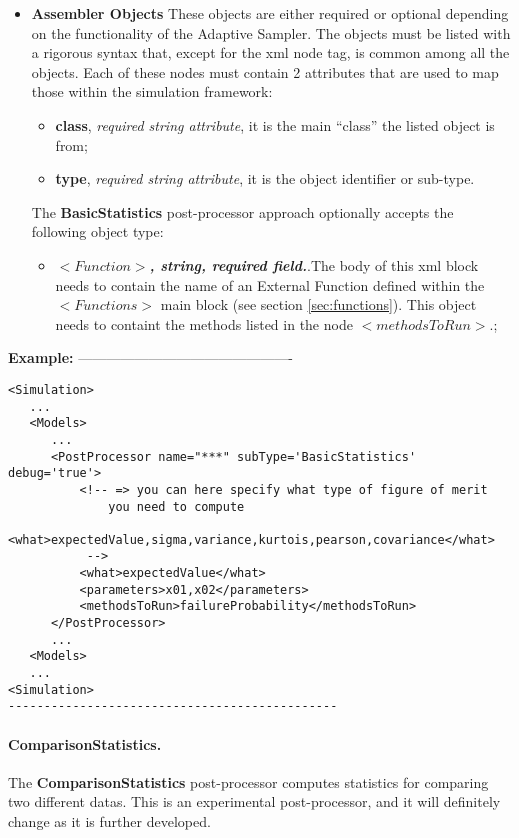 \begin{itemize}
   \item \textbf{Assembler Objects} These objects are either required or optional depending on the functionality of the Adaptive Sampler. The objects must be listed with a rigorous syntax that, except for the xml node tag, is common among all the objects.  
Each of these nodes  must contain 2 attributes that are used to map those within the simulation framework:
   \begin{itemize}
     \item \textbf{class}, \textit{required string attribute}, it is the main ``class'' the listed object is from;
     \item \textbf{type},  \textit{required string attribute}, it is the object identifier or sub-type.
    \end{itemize}
The  \textbf{BasicStatistics} post-processor approach  optionally accepts the following object type:
   \begin{itemize}
       \item $<Function>$\textbf{\textit{, string, required field.}}.The body of this xml block needs to contain the name of an External Function defined within the $<Functions>$ main block (see section \ref{sec:functions}). This object needs to containt the methods listed in the node $<methodsToRun>$.;
    \end{itemize}
\end{itemize}
\textbf{Example:}
----------------------------------------------
\begin{lstlisting}[style=XML]
<Simulation>
   ...
   <Models>
      ...
      <PostProcessor name="***" subType='BasicStatistics'  debug='true'>
          <!-- => you can here specify what type of figure of merit
              you need to compute
             <what>expectedValue,sigma,variance,kurtois,pearson,covariance</what> 
           -->
          <what>expectedValue</what>
          <parameters>x01,x02</parameters>
          <methodsToRun>failureProbability</methodsToRun>
      </PostProcessor>
      ...
   <Models>
   ...
<Simulation>
----------------------------------------------
\end{lstlisting}

\paragraph{ComparisonStatistics.}
\label{ComparisonStatistics}
The \textbf{ComparisonStatistics} post-processor computes statistics
for comparing two different datas.  This is an experimental
post-processor, and it will definitely change as it is further
developed.

